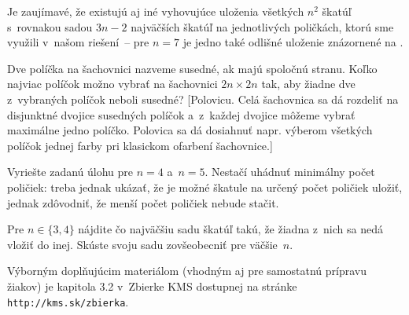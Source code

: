 {\poznamka
Je zaujímavé, že existujú aj iné vyhovujúce uloženia všetkých $n^2$ škatúľ
s~rovnakou sadou $3n-2$ najväčších škatúľ na jednotlivých poličkách,
ktorú sme využili v~našom riešení~--
pre $n=7$ je jedno také odlišné uloženie znázornené na \obr.
%


Dve políčka na šachovnici nazveme susedné, ak majú spoločnú stranu.
Koľko najviac políčok možno vybrať na šachovnici $2n \times 2n$ tak, aby
žiadne dve z~vybraných políčok neboli susedné?
[Polovicu. Celá šachovnica sa dá rozdeliť na disjunktné dvojice
susedných políčok a~z~každej dvojice môžeme vybrať maximálne jedno políčko.
Polovica sa dá dosiahnuť napr. výberom všetkých políčok jednej farby pri
klasickom ofarbení šachovnice.]

Vyriešte zadanú úlohu pre $n = 4$ a~$n = 5$. Nestačí uhádnuť minimálny
počet poličiek: treba jednak ukázať, že je možné škatule na určený
počet poličiek uložiť, jednak zdôvodniť, že menší počet poličiek nebude
stačit.

Pre $n \in \{3,4\}$ nájdite čo najväčšiu sadu škatúľ takú, že žiadna
z~nich sa nedá vložiť do inej. Skúste svoju sadu zovšeobecniť pre väčšie~$n$.

\medskip\everypar{}
Výborným doplňujúcim materiálom (vhodným aj pre samostatnú prípravu
žiakov) je kapitola 3.2 v~Zbierke KMS dostupnej na stránke {\tt
http://kms.sk/\allowbreak zbierka}.
}

